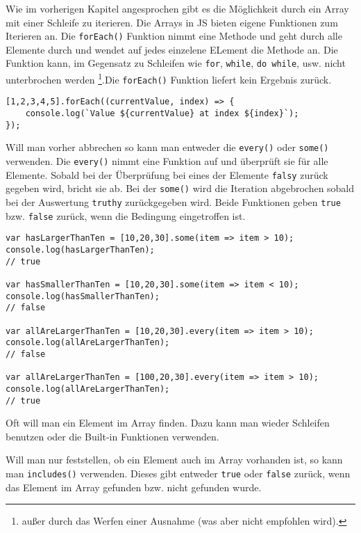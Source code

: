 \documentclass[babel]{book}
\begin{document}
Wie im vorherigen Kapitel angesprochen gibt es die Möglichkeit durch ein Array mit einer Schleife zu iterieren. Die Arrays in JS bieten eigene Funktionen zum Iterieren an. Die \lstinline|forEach()| Funktion nimmt eine Methode und geht durch alle Elemente durch und wendet auf jedes einzelene ELement die Methode an. Die Funktion kann, im Gegensatz zu Schleifen wie \lstinline|for|, \lstinline|while|, \lstinline|do while|, usw. nicht unterbrochen werden \footnote{außer durch das Werfen einer Ausnahme (was aber nicht empfohlen wird).}.Die \lstinline|forEach()| Funktion liefert kein Ergebnis zurück.

\begin{lstlisting}[caption=Array Konstruktor]
[1,2,3,4,5].forEach((currentValue, index) => {
	console.log(`Value ${currentValue} at index ${index}`);
});
\end{lstlisting}

Will man vorher abbrechen so kann man entweder die \lstinline|every()| oder \lstinline|some()| verwenden. Die \lstinline|every()| nimmt eine Funktion auf und überprüft sie für alle Elemente. Sobald bei der Überprüfung bei eines der Elemente \lstinline|falsy| zurück gegeben wird, bricht sie ab. Bei der \lstinline|some()| wird die Iteration abgebrochen sobald bei der Auswertung \lstinline|truthy| zurückgegeben wird. Beide Funktionen geben \lstinline|true| bzw. \lstinline|false| zurück, wenn die Bedingung eingetroffen ist.

\begin{lstlisting}[caption=Array Konstruktor]
var hasLargerThanTen = [10,20,30].some(item => item > 10);
console.log(hasLargerThanTen);
// true

var hasSmallerThanTen = [10,20,30].some(item => item < 10);
console.log(hasSmallerThanTen);
// false

var allAreLargerThanTen = [10,20,30].every(item => item > 10);
console.log(allAreLargerThanTen);
// false

var allAreLargerThanTen = [100,20,30].every(item => item > 10);
console.log(allAreLargerThanTen);
// true
\end{lstlisting}

Oft will man ein Element im Array finden. Dazu kann man wieder Schleifen benutzen oder die Built-in Funktionen verwenden. 

Will man nur feststellen, ob ein Element auch im Array vorhanden ist, so kann man \lstinline|includes()| verwenden. Dieses gibt entweder \lstinline|true| oder \lstinline|false| zurück, wenn das Element im Array gefunden bzw. nicht gefunden wurde.
\end{document}
